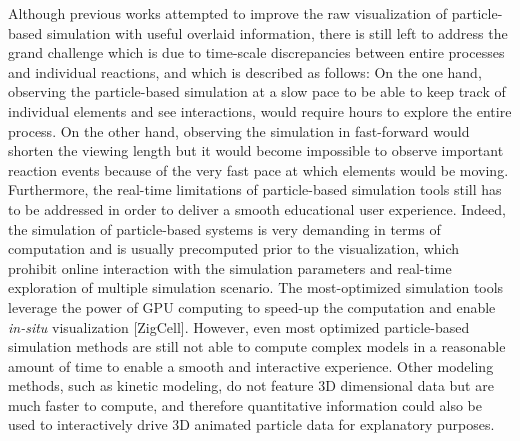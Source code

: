 Although previous works attempted to improve the raw visualization of particle-based simulation with useful overlaid information, there is still left to address the grand challenge which is due to time-scale discrepancies between entire processes and individual reactions, and which is described as follows: 
On the one hand, observing the particle-based simulation at a slow pace to be able to keep track of individual elements and see interactions, would require hours to explore the entire process.
On the other hand, observing the simulation in fast-forward would shorten the viewing length but it would become impossible to observe important reaction events because of the very fast pace at which elements would be moving.
Furthermore, the real-time limitations of particle-based simulation tools still has to be addressed in order to deliver a smooth educational user experience.
Indeed, the simulation of particle-based systems is very demanding in terms of computation and is usually precomputed prior to the visualization, which prohibit online interaction with the simulation parameters and real-time exploration of multiple simulation scenario.
The most-optimized simulation tools leverage the power of GPU computing to speed-up the computation and enable \textit{in-situ} visualization [ZigCell].
However, even most optimized particle-based simulation methods are still not able to compute complex models in a reasonable amount of time to enable a smooth and interactive experience.
Other modeling methods, such as kinetic modeling, do not feature 3D dimensional data but are much faster to compute, and therefore quantitative information could also be used to interactively drive 3D animated particle data for explanatory purposes.

